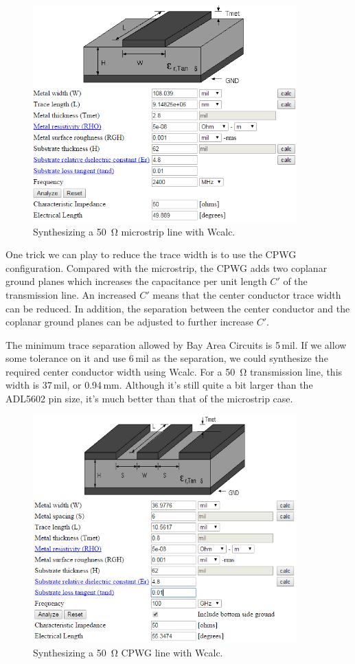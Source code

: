 \documentclass[12pt,letterpaper]{scrartcl}
\begin{document}
	\begin{figure}[h]
		\centering
		\includegraphics[width=4in]{ustrip-synth}
		\caption{Synthesizing a \SI{50}{\ohm} microstrip line with Wcalc.}
		\label{fig:ustrip-synth}
	\end{figure}

One trick we can play to reduce the trace width is to use the CPWG configuration. Compared with the microstrip, the CPWG adds two coplanar ground planes which increases the capacitance per unit length $C'$ of the transmission line. An increased $C'$ means that the center conductor trace width can be reduced. In addition, the separation between the center conductor and the coplanar ground planes can be adjusted to further increase $C'$.  

The minimum trace separation allowed by Bay Area Circuits is 5\,mil. If we allow some tolerance on it and use 6\,mil as the separation, we could synthesize the required center conductor width using Wcalc. For a \SI{50}{\ohm} transmission line, this width is 37\,mil, or 0.94\,mm. Although it's still quite a bit larger than the ADL5602 pin size, it's much better than that of the microstrip case. 

	\begin{figure}[hp]
		\centering
		\includegraphics[width=4in]{cpwg-synth}
		\caption{Synthesizing a \SI{50}{\ohm} CPWG line with Wcalc.}
		\label{fig:cpwg-synth}
	\end{figure}
\end{document}
